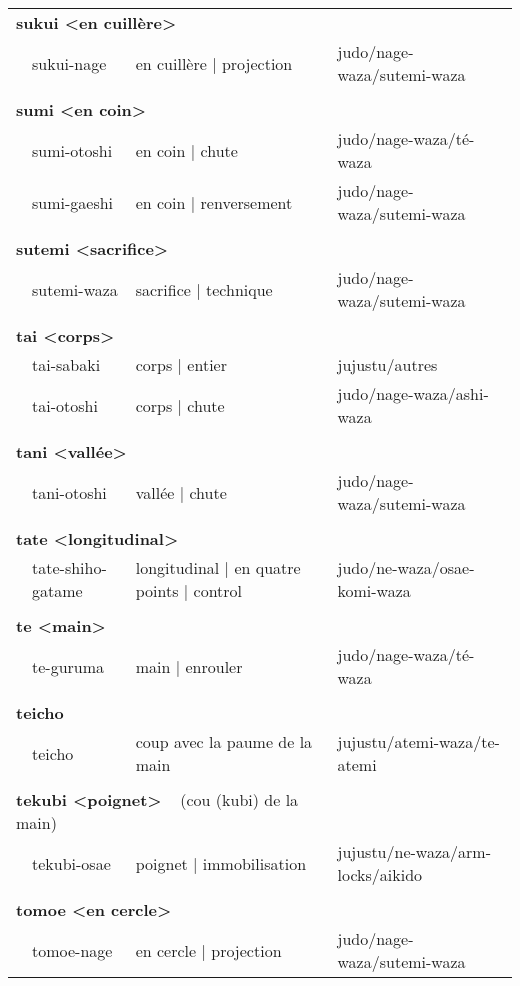 \documentclass{article}%
\begin{document}
\begin{longtable}{rlll}
\multicolumn{3}{l}{\textbf{sukui <en cuillère>}%
~%
}&\\%
&sukui{-}nage&en cuillère | projection&judo/nage{-}waza/sutemi{-}waza\\%
&&&\\%
\multicolumn{3}{l}{\textbf{sumi <en coin>}%
~%
}&\\%
&sumi{-}otoshi&en coin | chute&judo/nage{-}waza/té{-}waza\\%
&sumi{-}gaeshi&en coin | renversement&judo/nage{-}waza/sutemi{-}waza\\%
&&&\\%
\multicolumn{3}{l}{\textbf{sutemi <sacrifice>}%
~%
}&\\%
&sutemi{-}waza&sacrifice | technique&judo/nage{-}waza/sutemi{-}waza\\%
&&&\\%
\multicolumn{3}{l}{\textbf{tai <corps>}%
~%
}&\\%
&tai{-}sabaki&corps | entier&jujustu/autres\\%
&tai{-}otoshi&corps | chute&judo/nage{-}waza/ashi{-}waza\\%
&&&\\%
\multicolumn{3}{l}{\textbf{tani <vallée>}%
~%
}&\\%
&tani{-}otoshi&vallée | chute&judo/nage{-}waza/sutemi{-}waza\\%
&&&\\%
\multicolumn{3}{l}{\textbf{tate <longitudinal>}%
~%
}&\\%
&tate{-}shiho{-}gatame&longitudinal | en quatre points | control&judo/ne{-}waza/osae{-}komi{-}waza\\%
&&&\\%
\multicolumn{3}{l}{\textbf{te <main>}%
~%
}&\\%
&te{-}guruma&main | enrouler&judo/nage{-}waza/té{-}waza\\%
&&&\\%
\multicolumn{3}{l}{\textbf{teicho }%
~%
}&\\%
&teicho&coup avec la paume de la main&jujustu/atemi{-}waza/te{-}atemi\\%
&&&\\%
\multicolumn{3}{l}{\textbf{tekubi <poignet>}%
~%
(cou (kubi) de la main)}&\\%
&tekubi{-}osae&poignet | immobilisation&jujustu/ne{-}waza/arm{-}locks/aikido\\%
&&&\\%
\multicolumn{3}{l}{\textbf{tomoe <en cercle>}%
~%
}&\\%
&tomoe{-}nage&en cercle | projection&judo/nage{-}waza/sutemi{-}waza\\%

\end{longtable}
\end{document}
